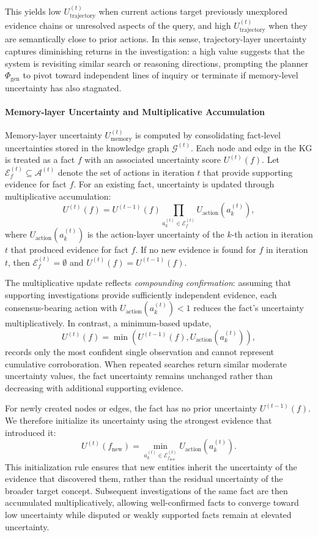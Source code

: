 \documentclass{article}
\begin{document}
This yields low $U_{\text{trajectory}}^{(t)}$ when current actions target previously unexplored evidence chains or unresolved aspects of the query, and high $U_{\text{trajectory}}^{(t)}$ when they are semantically close to prior actions. In this sense, trajectory-layer uncertainty captures diminishing returns in the investigation: a high value suggests that the system is revisiting similar search or reasoning directions, prompting the planner $\Phi_{\text{gen}}$ to pivot toward independent lines of inquiry or terminate if memory-level uncertainty has also stagnated.

\paragraph{Memory-layer Uncertainty and Multiplicative Accumulation}
Memory-layer uncertainty $U_{\text{memory}}^{(t)}$ is computed by consolidating fact-level uncertainties stored in the knowledge graph $\mathcal{G}^{(t)}$. Each node and edge in the KG is treated as a fact $f$ with an associated uncertainty score $U^{(t)}(f)$. Let $\mathcal{E}_f^{(t)} \subseteq \mathcal{A}^{(t)}$ denote the set of actions in iteration $t$ that provide supporting evidence for fact $f$. For an existing fact, uncertainty is updated through multiplicative accumulation:
\begin{equation}
U^{(t)}(f)
=
U^{(t-1)}(f)
\prod_{a_k^{(t)} \in \mathcal{E}_f^{(t)}}
U_{\text{action}}(a_k^{(t)}),
\end{equation}
where $U_{\text{action}}(a_k^{(t)})$ is the action-layer uncertainty of the $k$-th action in iteration $t$ that produced evidence for fact $f$. If no new evidence is found for $f$ in iteration $t$, then $\mathcal{E}_f^{(t)}=\emptyset$ and $U^{(t)}(f)=U^{(t-1)}(f)$.

The multiplicative update reflects \textit{compounding confirmation}: assuming that supporting investigations provide sufficiently independent evidence, each consensus-bearing action with $U_{\text{action}}(a_k^{(t)}) < 1$ reduces the fact's uncertainty multiplicatively. In contrast, a minimum-based update,
\[
U^{(t)}(f)=\min\left(U^{(t-1)}(f), U_{\text{action}}(a_k^{(t)})\right),
\]
records only the most confident single observation and cannot represent cumulative corroboration. When repeated searches return similar moderate uncertainty values, the fact uncertainty remains unchanged rather than decreasing with additional supporting evidence.

For newly created nodes or edges, the fact has no prior uncertainty $U^{(t-1)}(f)$. We therefore initialize its uncertainty using the strongest evidence that introduced it:
\begin{equation}
U^{(t)}(f_{\text{new}})
=
\min_{a_k^{(t)} \in \mathcal{E}_{f_{\text{new}}}^{(t)}}
U_{\text{action}}(a_k^{(t)}).
\end{equation}
This initialization rule ensures that new entities inherit the uncertainty of the evidence that discovered them, rather than the residual uncertainty of the broader target concept. Subsequent investigations of the same fact are then accumulated multiplicatively, allowing well-confirmed facts to converge toward low uncertainty while disputed or weakly supported facts remain at elevated uncertainty.
\end{document}
